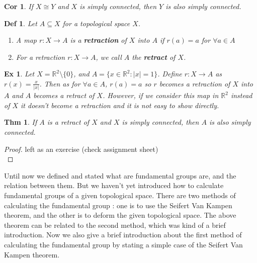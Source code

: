 \documentclass[paper=a4, fontsize=11pt]{scrartcl}
\newtheorem{theorem}{Thm}
\newtheorem{definition}{Def}
\newtheorem{example}{Ex}
\newtheorem{corollary}{Cor}
\begin{document}
\begin{corollary}
	If $X \cong Y$ and $X$ is simply connected, then $Y$ is also simply connected.\\
\end{corollary}

\begin{definition}
	Let $A \subseteq X$ for a topological space $X$.
	\begin{enumerate}
		\item A map $r:X \to A$ is a \textbf{retraction} of $X$ into $A$ if $r(a)=a$ for $\forall a \in A$
		\item For a retraction $r:X\to A$, we call $A$ the \textbf{retract} of $X$.\\
	\end{enumerate}
\end{definition}

\begin{example}
	Let $X=\mathbb{R}^2 \setminus \{0\}$, and $A=\{x \in \mathbb{R}^2 : |x|=1\}$. Define $r:X\to A$ as $r(x)=\frac{x}{|x|}$. Then as for $\forall a \in A$, $r(a)=a$ so $r$ becomes a retraction of $X$ into $A$ and $A$ becomes a retract of $X$. However, if we consider this map in $\mathbb{R}^2$ instead of $X$ it doesn't become a retraction and it is not easy to show directly.\\
\end{example}

\begin{theorem}
	If $A$ is a retract of $X$ and $X$ is simply connected, then $A$ is also simply connected.\\
\end{theorem}

\begin{proof}
	left as an exercise (check assignment sheet)\\
\end{proof}

Until now we defined and stated what are fundamental groups are, and the relation between them. But we haven't yet introduced how to calculate fundamental groups of a given topological space. There are two methods of calculating the fundamental group : one is to use the Seifert Van Kampen theorem, and the other is to deform the given topological space. The above theorem can be related to the second method, which was kind of a brief introduction. Now we also give a brief introduction  about the first method of calculating the fundamental group by stating a simple case of the Seifert Van Kampen theorem. \\
\end{document}

